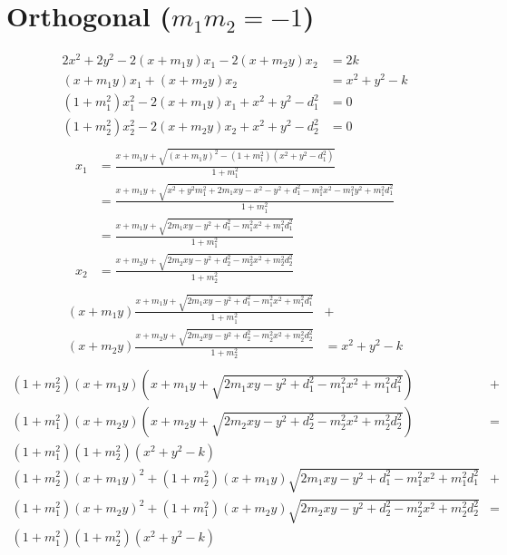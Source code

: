 \documentclass{article}
\begin{document}
\section{Orthogonal ($m_1 m_2 = -1$)}
\begin{align*}
  2 x^2 + 2 y^2 - 2 (x + m_1 y) x_1 - 2 (x + m_2 y) x_2 &= 2 k\\
  (x + m_1 y) x_1 + (x + m_2 y) x_2 &= x^2 + y^2 - k\\
  (1 + m_1^2) x_1^2 - 2 (x + m_1 y) x_1  + x^2 + y^2 - d_1^2 &= 0\\
  (1 + m_2^2) x_2^2 - 2 (x + m_2 y) x_2  + x^2 + y^2 - d_2^2 &= 0\\
\end{align*}
\begin{align*}
  x_1 &= \frac{x + m_1 y + \sqrt{(x + m_1 y)^2 - (1 + m_1^2)(x^2 + y^2 - d_1^2)}}{1 + m_1^2}\\
      &= \frac{x + m_1 y + \sqrt{x^2 + y^2 m_1^2 + 2 m_1 x y - x^2 - y^2 + d_1^2 - m_1^2 x^2 - m_1^2 y^2 + m_1^2 d_1^2}}{1 + m_1^2}\\
      &= \frac{x + m_1 y + \sqrt{2 m_1 x y - y^2 + d_1^2 - m_1^2 x^2 + m_1^2 d_1^2}}{1 + m_1^2}\\
  x_2 &= \frac{x + m_2 y + \sqrt{2 m_2 x y - y^2 + d_2^2 - m_2^2 x^2 + m_2^2 d_2^2}}{1 + m_2^2}\\
\end{align*}
\begin{align*}
  (x + m_1 y) \frac{x + m_1 y + \sqrt{2 m_1 x y - y^2 + d_1^2 - m_1^2 x^2 + m_1^2 d_1^2}}{1 + m_1^2} &+ \\
  (x + m_2 y) \frac{x + m_2 y + \sqrt{2 m_2 x y - y^2 + d_2^2 - m_2^2 x^2 + m_2^2 d_2^2}}{1 + m_2^2} &= x^2 + y^2 - k\\
\end{align*}
\begin{align*}
  (1 + m_2^2)(x + m_1 y)(x + m_1 y + \sqrt{2 m_1 x y - y^2 + d_1^2 - m_1^2 x^2 + m_1^2 d_1^2}) &+ \\
  (1 + m_1^2)(x + m_2 y)(x + m_2 y + \sqrt{2 m_2 x y - y^2 + d_2^2 - m_2^2 x^2 + m_2^2 d_2^2}) &= \\
  (1 + m_1^2)(1 + m_2^2)(x^2 + y^2 - k)\\
  (1 + m_2^2)(x + m_1 y)^2 + (1 + m_2^2)(x + m_1 y)\sqrt{2 m_1 x y - y^2 + d_1^2 - m_1^2 x^2 + m_1^2 d_1^2} &+ \\
  (1 + m_1^2)(x + m_2 y)^2 + (1 + m_1^2)(x + m_2 y)\sqrt{2 m_2 x y - y^2 + d_2^2 - m_2^2 x^2 + m_2^2 d_2^2} &= \\
  (1 + m_1^2)(1 + m_2^2)(x^2 + y^2 - k)\\
\end{align*}
\end{document}
